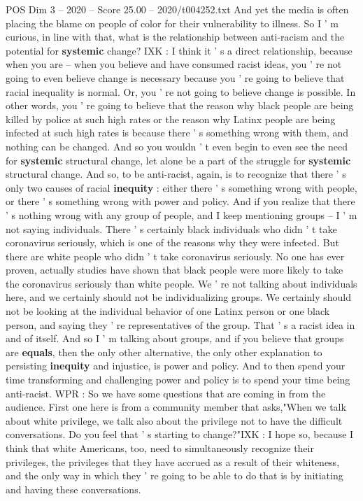\begin{textsample}{POS Dim 3 – 2020 – Score 25.00 – 2020/t004252.txt}
And yet the media is often placing the blame on people of color for their vulnerability to illness.
So I ' m curious, in line with that, what is the relationship between anti-racism and the potential for \textbf{systemic} change?
IXK : I think it ' s a direct relationship, because when you are -- when you believe and have consumed racist ideas, you ' re not going to even believe change is necessary because you ' re going to believe that racial inequality is normal.
Or, you ' re not going to believe change is possible.
In other words, you ' re going to believe that the reason why black people are being killed by police at such high rates or the reason why Latinx people are being infected at such high rates is because there ' s something wrong with them, and nothing can be changed.
And so you wouldn ' t even begin to even see the need for \textbf{systemic} structural change, let alone be a part of the struggle for \textbf{systemic} structural change.
And so, to be anti-racist, again, is to recognize that there ' s only two causes of racial \textbf{inequity} : either there ' s something wrong with people, or there ' s something wrong with power and policy.
And if you realize that there ' s nothing wrong with any group of people, and I keep mentioning groups -- I ' m not saying individuals.
There ' s certainly black individuals who didn ' t take coronavirus seriously, which is one of the reasons why they were infected.
But there are white people who didn ' t take coronavirus seriously.
No one has ever proven, actually studies have shown that black people were more likely to take the coronavirus seriously than white people.
We ' re not talking about individuals here, and we certainly should not be individualizing groups.
We certainly should not be looking at the individual behavior of one Latinx person or one black person, and saying they ' re representatives of the group.
That ' s a racist idea in and of itself.
And so I ' m talking about groups, and if you believe that groups are \textbf{equals}, then the only other alternative, the only other explanation to persisting \textbf{inequity} and injustice, is power and policy.
And to then spend your time transforming and challenging power and policy is to spend your time being anti-racist.
WPR : So we have some questions that are coming in from the audience.
First one here is from a community member that asks,"When we talk about white privilege, we talk also about the privilege not to have the difficult conversations.
Do you feel that ' s starting to change?"IXK : I hope so, because I think that white Americans, too, need to simultaneously recognize their privileges, the privileges that they have accrued as a result of their whiteness, and the only way in which they ' re going to be able to do that is by initiating and having these conversations.

\end{textsample}
